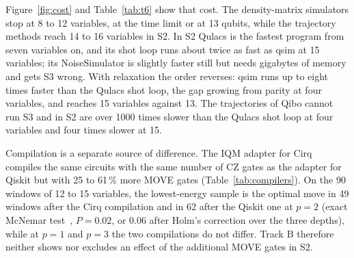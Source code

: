 \documentclass{scspaperproc}
\begin{document}
Figure~\ref{fig:cost} and Table~\ref{tab:t6} show that cost. The
density-matrix simulators stop at 8 to 12 variables, at the time limit or at
13 qubits, while the trajectory methods reach 14 to 16 variables in S2. In S2
Qulacs is the fastest program from seven variables on, and its shot loop runs
about twice as fast as qsim at 15 variables; its NoiseSimulator is slightly
faster still but needs gigabytes of memory and gets S3 wrong. With relaxation
the order reverses: qsim runs up to eight times faster than the Qulacs shot
loop, the gap growing from parity at four variables, and reaches 15 variables
against 13. The trajectories of Qibo cannot run S3 and in S2 are over 1000 times
slower than the Qulacs shot loop at four variables and four times slower at
15.

Compilation is a separate source of difference. The IQM adapter
for Cirq compiles the same circuits with the same number of CZ gates as the
adapter for Qiskit but with 25 to 61\,\% more MOVE gates
(Table~\ref{tab:compilers}). On the 90 windows of 12 to 15 variables, the
lowest-energy sample is the optimal move in 49 windows after the Cirq
compilation and in 62 after the Qiskit one at $p = 2$ (exact McNemar
test~\cite{mcnemar1947}, $P = 0.02$, or 0.06 after Holm's correction over the
three depths), while at $p = 1$ and $p = 3$ the two compilations do not
differ. Track B therefore neither shows nor excludes an effect of the
additional MOVE gates in S2.
\end{document}
